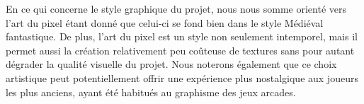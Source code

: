 En ce qui concerne le style graphique du projet, nous nous somme orienté vers l’art du pixel étant donné que celui-ci se fond bien dans le style Médiéval fantastique.
De plus, l’art du pixel est un style non seulement intemporel, mais il permet aussi la création relativement peu coûteuse de textures sans pour autant dégrader la qualité visuelle du projet.
Nous noterons également que ce choix artistique peut potentiellement offrir une expérience plus nostalgique aux joueurs les plus anciens, ayant été habitués au graphisme des jeux arcades.








